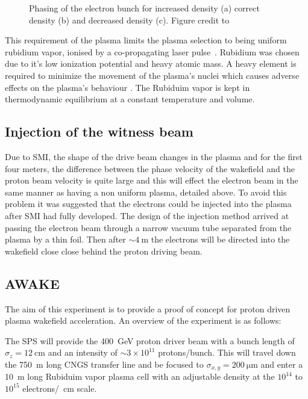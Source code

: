 \begin{figure}[!t]
	\centering
	\caption{Phasing of the electron bunch for increased density (a) correct
		density (b) and decreased density (c). Figure credit to
		\cite{caldwell2015rkk}}
	\label{fig:plasma_phase}
\end{figure}

This requirement of the plasma limits the plasma selection to being uniform
rubidium vapor, ionised by a co-propagating laser
pulse~\cite{oz2014novel,oz2014bja}.  Rubidium was chosen due to it's low
ionization potential and heavy atomic mass.  A heavy element is required to
minimize the movement of the plasma's nuclei which causes adverse effects on
the plasma's behaviour \cite{vieira2012nj, vieira2014bqa}. The Rubiduim vapor
is kept in thermodynamic equilibrium at a constant temperature and volume.

\subsection{Injection of the witness beam}

Due to SMI, the shape of the drive beam changes in the plasma and for the first
four meters, the difference between the phase velocity of the wakefield and the
proton beam velocity is quite large and this will effect the electron beam in
the same manner as having a non uniform plasma, detailed above. To avoid this
problem it was suggested that the electrons could be injected into the plasma
after SMI had fully developed. The design of the injection method arrived at
passing the electron beam through a narrow vacuum tube separated from the
plasma by a thin foil. Then after \(\sim \SI{4}{\meter}\) the electrons will be
directed into the wakefield close close behind the proton driving beam.

\subsection{AWAKE}

The aim of this experiment is to provide a proof of concept for proton driven
plasma wakefield acceleration.  An overview of the experiment is as follows:

The SPS will provide the \SI{400}{\giga\electronvolt} proton driver beam with a
bunch length of \(\sigma_z = \SI{12}{\centi\meter}\) and an intensity of \(\sim
3\times 10^{11}\) protons/bunch. This will travel down the \SI{750}{\meter}
long CNGS transfer line and be focused to \(\sigma_{x,y} =
\SI{200}{\micro\meter}\) and enter a \SI{10}{\meter} long Rubiduim vapor plasma
cell with an adjustable density at the \(10^{14}\) to \(10^{15}\)
electrons/\si{\per\centi\meter} scale.

